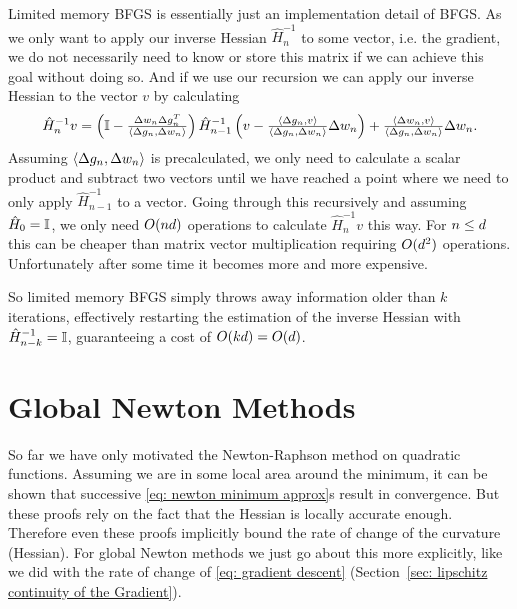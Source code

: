 Limited memory BFGS is essentially just an implementation detail of BFGS. As
we only want to apply our inverse Hessian \(\hat{H}_n^{-1}\) to some vector,
i.e. the gradient, we do not necessarily need to know or store this matrix if
we can achieve this goal without doing so. And if we use our recursion we can
apply our inverse Hessian to the vector \(v\) by calculating
\begin{align*}
	\hat{H}_n^{-1}v =
	\left(\mathbb{I}-\tfrac{\Delta w_n \Delta g_n^T}{\langle \Delta g_n, \Delta w_n\rangle}\right)
	\hat{H}_{n-1}^{-1}
	\left(v-\tfrac{ \langle \Delta g_n, v\rangle}{\langle \Delta g_n, \Delta w_n\rangle}\Delta w_n\right)
	+ \tfrac{\langle \Delta w_n, v\rangle}{\langle \Delta g_n, \Delta w_n\rangle}\Delta w_n.
\end{align*}
Assuming \(\langle \Delta g_n, \Delta w_n\rangle\) is precalculated, we
only need to calculate a scalar product and subtract two vectors until we have
reached a point where we need to only apply \(\hat{H}_{n-1}^{-1}\) to a vector.
Going through this recursively and assuming \(\hat{H}_0=\mathbb{I}\), we only
need \(O(nd)\) operations to calculate \(\hat{H}_n^{-1}v\) this way.
For \(n\le d\) this can be cheaper than matrix vector multiplication
requiring \(O(d^2)\) operations. Unfortunately after some time it
becomes more and more expensive.

So limited memory BFGS simply throws away information older than \(k\) iterations,
effectively restarting the estimation of the inverse Hessian with
\(\hat{H}_{n-k}^{-1}=\mathbb{I}\), guaranteeing a cost of \(O(kd)=O(d)\).

\section{Global Newton Methods}

So far we have only motivated the Newton-Raphson method on quadratic functions.
Assuming we are in some local area around the minimum, it can be shown that
successive \ref{eq: newton minimum approx}s result in convergence. But these
proofs rely on the fact that the Hessian is locally accurate enough. Therefore
even these proofs implicitly bound the rate of change of the curvature (Hessian).
For global Newton methods we just go about this more explicitly, like we did
with the rate of change of \ref{eq: gradient descent} (Section~\ref{sec:
lipschitz continuity of the Gradient}).

